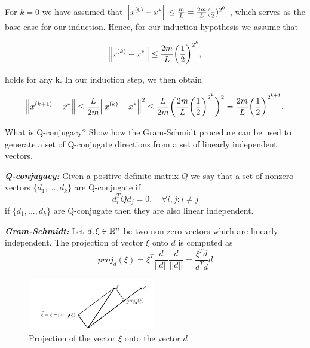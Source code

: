 \documentclass[12pt,a4paper]{article}
\begin{document}
For $k = 0$ we have assumed that $\norm{x^{(0)} - x^*} \leq \frac{m}{L}=\frac{2m}{L}(\frac{1}{2})^{2^0}$ , which serves as the base case for
our induction. Hence, for our induction hypothesis we assume that

\begin{align*}
    \norm{\kth{x} -x^*} \leq \frac{2m}{L}\biggl(\frac{1}{2}\biggr)^{2^k},
\end{align*}

holds for any k. In our induction step, we then obtain

\begin{equation*}\begin{aligned}
    \norm{\kth[k+1]{x} -x^*} \leq \frac{L}{2m} \norm{\kth{x}-x^*}^2 \leq \frac{L}{2m} \biggl(\frac{2m}{L} \biggl(\frac{1}{2}\biggr)^{2^k}\biggr)^2=\frac{2m}{L}\biggl(\frac{1}{2}\biggr)^{2^{k+1}}.
\end{aligned}\end{equation*}

\begin{question}
What is Q-conjugacy? Show how the Gram-Schmidt procedure can be
used to generate a set of Q-conjugate directions from a set of linearly
independent vectors.
\end{question}


	\textbf{\textit{Q-conjugacy:}}
		Given a positive definite matrix $Q$ we say that a set of nonzero vectors $\{d_1,...,d_k\}$ are Q-conjugate if
		$$ d_i^T Q d_j = 0, \quad \forall i,j : i \neq j$$
		if $\{d_1,...,d_k\}$ are Q-conjugate then they are also linear independent.
	
	\textbf{\textit{Gram-Schmidt:}}
		Let $d,\xi \in \RR^n$ be two non-zero vectors which are linearly independent. The projection of vector $\xi$ onto $d$ is computed as
		$$ proj_d(\xi) = \xi^T \frac{d}{||d||}\frac{d}{||d||} = \frac{\xi^T d}{d^Td}d$$
		
		\begin{figure}
			\centering
			\includegraphics[width=0.5\textwidth]{figures/proj.jpg}
			\caption{Projection of the vector $\xi$ onto the vector $d$}
		\end{figure}
		
\end{document}
